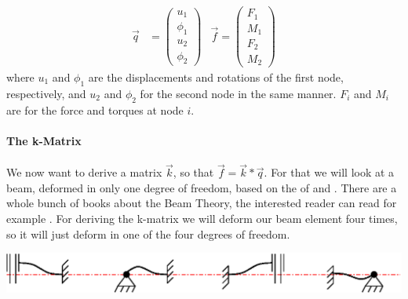 \begin{align}
\vec{q}&=\left(\begin{array}{c}
u_1 \\ 
\phi_1 \\ 
u_2 \\ 
\phi_2
\end{array} \right)&\vec{f}=\left(\begin{array}{c}
F_1 \\ 
M_1 \\ 
F_2 \\ 
M_2
\end{array}\right)\nonumber
\end{align}
where $u_1$ and $\phi_1$ are the displacements and rotations of the first node, respectively, and  $u_2$ and $\phi_2$ for the second node in the same manner. $F_i$ and $M_i$ are for the force and torques at node $i$.
\bigskip 
\paragraph{The k-Matrix}

We now want to derive a matrix $\vec{k}$, so that $\vec{f}=\vec{k}*\vec{q}$. For that we will look at a beam, deformed in only one degree of freedom, based on the  of  and . There are a whole bunch of books about the Beam Theory, the interested reader can read for example \cite{timoschenko}. For deriving the k-matrix we will deform our beam element four times, so it will just deform in one of the four degrees of freedom.\\
\bigskip
\begin{center}
\includegraphics[scale=1.2]{fourDeformations}
\end{center}
\bigskip 

